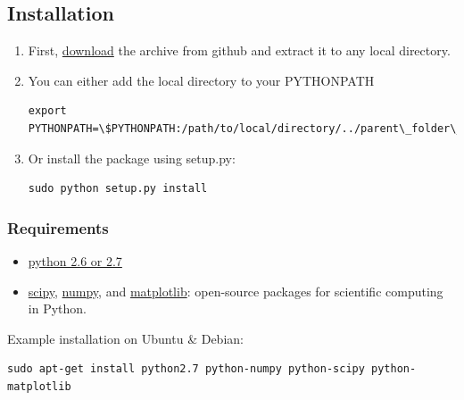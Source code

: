 \documentclass[letterpaper,10pt,english]{sphinxmanual}
\begin{document}
\subsection{Installation}
\label{Install:installation}\label{Install::doc}\begin{enumerate}
\item {} 
First, \href{https://github.com/marionmari/pyGPs/releases/tag/v1.1}{download} the archive from github and extract it to any local directory.

\end{enumerate}
\begin{enumerate}
\setcounter{enumi}{1}
\item {} 
You can either add the local directory to your PYTHONPATH

\begin{Verbatim}[commandchars=\\\{\}]
export PYTHONPATH=\$PYTHONPATH:/path/to/local/directory/../parent\_folder\_of\_pyGPs
\end{Verbatim}

\item {} 
Or install the package using setup.py:

\begin{Verbatim}[commandchars=\\\{\}]
sudo python setup.py install
\end{Verbatim}

\end{enumerate}


\subsubsection{Requirements}
\label{Install:requirements}\begin{itemize}
\item {} 
\href{http://www.python.org/}{python 2.6 or 2.7}

\item {} 
\href{http://www.scipy.org/}{scipy}, \href{http://www.numpy.org/}{numpy}, and \href{http://matplotlib.org/}{matplotlib}: open-source packages for scientific computing in Python.

\end{itemize}

Example installation on Ubuntu \& Debian:

\begin{Verbatim}[commandchars=\\\{\}]
sudo apt-get install python2.7 python-numpy python-scipy python-matplotlib
\end{Verbatim}
\end{document}
